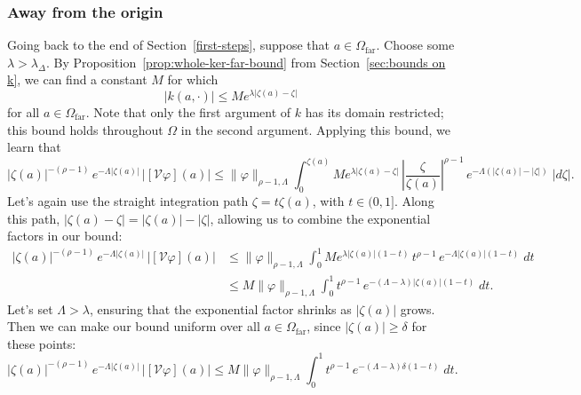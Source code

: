 \documentclass{article}
\theoremstyle{plain}
\newcommand{\volterra}{\mathcal{V}}
\newcommand{\domain}{\Omega}
\newcommand{\far}{\Omega_\text{far}}
\begin{document}
\subsubsection{Away from the origin}\label{far-bound}
Going back to the end of Section~\ref{first-steps}, suppose that $a \in \far$. Choose some $\lambda > \lambda_\Delta$. By Proposition~\ref{prop:whole-ker-far-bound} from Section~\ref{sec:bounds on k}, we can find a constant $M$ for which
\[ |k(a, \cdot)| \le M e^{\lambda |\zeta(a) - \zeta|} \]
for all $a \in \far$. Note that only the first argument of $k$ has its domain restricted; this bound holds throughout $\domain$ in the second argument. Applying this bound, we learn that
\[ |\zeta(a)|^{-(\rho-1)}\,e^{-\Lambda|\zeta(a)|}\,|[\volterra\varphi](a)| \le \|\varphi\|_{\rho-1, \Lambda} \int_0^{\zeta(a)} M e^{\lambda |\zeta(a) - \zeta|}\,\left|\frac{\zeta}{\zeta(a)}\right|^{\rho-1}\,e^{-\Lambda(|\zeta(a)| - |\zeta|)}\;|d\zeta|. \]
Let's again use the straight integration path $\zeta = t \zeta(a)$, with $t \in (0, 1]$. Along this path, $|\zeta(a) - \zeta| = |\zeta(a)| - |\zeta|$, allowing us to combine the exponential factors in our bound:
\begin{align*}
|\zeta(a)|^{-(\rho-1)}\,e^{-\Lambda|\zeta(a)|}\,|[\volterra\varphi](a)| & \le \|\varphi\|_{\rho-1, \Lambda} \int_0^1 M e^{\lambda |\zeta(a)|(1 - t)}\,t^{\rho-1}\,e^{-\Lambda |\zeta(a)|(1 - t)}\;dt \\
& \le M \|\varphi\|_{\rho-1, \Lambda} \int_0^1 t^{\rho-1}\,e^{-(\Lambda - \lambda)|\zeta(a)|(1 - t)}\;dt.
\end{align*}
Let's set $\Lambda > \lambda$, ensuring that the exponential factor shrinks as $|\zeta(a)|$ grows. Then we can make our bound uniform over all $a \in \far$, since $|\zeta(a)| \ge \delta$ for these points:
\[ |\zeta(a)|^{-(\rho-1)}\,e^{-\Lambda|\zeta(a)|}\,|[\volterra\varphi](a)| \le M \|\varphi\|_{\rho-1, \Lambda} \int_0^1 t^{\rho-1}\,e^{-(\Lambda - \lambda)\delta(1 - t)}\;dt. \]
\end{document}

